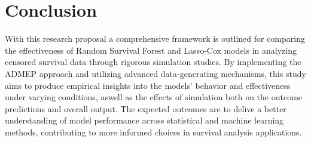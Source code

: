 \chapter{Conclusion}
\label{Chapter4}



With this research proposal a comprehensive framework is outlined for comparing the effectiveness of Random Survival Forest and Lasso-Cox models in analyzing censored survival data through rigorous simulation studies. By implementing the ADMEP approach and utilizing advanced data-generating mechanisms, this study aims to produce empirical insights into the models' behavior and effectiveness under varying conditions, aswell as the effects of simulation both on the outcome predictions and overall output. The expected outcomes are to delive a better understanding of model performance across statistical and machine learning methods, contributing to more informed choices in survival analysis applications.